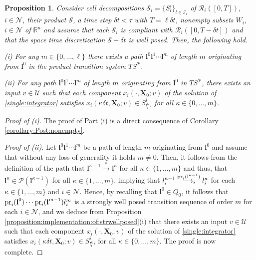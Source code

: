 \documentclass[reqno]{amsart}
\theoremstyle{plain}
\newtheorem{prop}[thm]{Proposition}
\theoremstyle{definition}
\numberwithin{equation}{section}
\begin{document}
\begin{prop} \label{proposition:sampled:traj:consistency}
Consider cell decompositions ${\ensuremath{\mathcal{S}}}_i=\{S_l^i\}_{l\in{\ensuremath{\mathcal{I}}}_i}$ of ${\ensuremath{\mathcal{R}}}_i([0,T])$, $i\in{\ensuremath{\mathcal{N}}}$, their product ${\ensuremath{\mathcal{S}}}$, a time step $\delta t<\tau$ with $T=\ell\delta t$, nonempty subsets $W_i$, $i\in{\ensuremath{\mathcal{N}}}$ of ${\ensuremath{\mathbb{R}^{{n}}}}$ and assume that each ${\ensuremath{\mathcal{S}}}_i$ is compliant with  ${\ensuremath{\mathcal{R}}}_i([0,T-\delta t])$ and that the space time discretization ${\ensuremath{\mathcal{S}}}-\delta t$ is well posed. Then, the following hold.

\noindent \textit{(i)} For any $m\in\{0,\ldots,\ell\}$ there exists a path ${\textbf{{l}}}^0 {\textbf{{l}}}^1\cdots{\textbf{{l}}}^{m}$ of length $m$ originating from ${\textbf{{l}}}^0$ in the product transition system $TS^{\ensuremath{\mathcal{P}}}$.

\noindent \textit{(ii)} For any path ${\textbf{{l}}}^0 {\textbf{{l}}}^1\cdots{\textbf{{l}}}^{m}$ of length $m$ originating from ${\textbf{{l}}}^0$ in $TS^{\ensuremath{\mathcal{P}}}$, there exists an input $v\in\mathcal{U}$ such that each component $x_i(\cdot,{\textbf{{X}}}_0;v)$ of the solution of \eqref{single:integrator} satisfies $x_i(\kappa\delta t,{\textbf{{X}}}_0;v)\in S^i_{l_i^{\kappa}}$, for all $\kappa\in\{0,\ldots,m\}$.
\end{prop}

\begin{proof}[Proof of (i)]
The proof of Part (i) is a direct consequence of Corollary \ref{corollary:Post:nonempty}.

\noindent \textit{Proof of (ii).} Let ${\textbf{{l}}}^0 {\textbf{{l}}}^1\cdots{\textbf{{l}}}^{m}$  be a path of length $m$ originating from ${\textbf{{l}}}^0$ and assume that without any loss of generality it holds $m\ne 0$. Then, it follows from the definition of the path that ${\textbf{{l}}}^{\kappa-1}\overset{*}{\longrightarrow}{\textbf{{l}}}^{\kappa}$ for all $\kappa\in\{1,\ldots,m\}$ and thus, that ${\textbf{{l}}}^{\kappa}\in{\ensuremath{\mathcal{P}}}({\textbf{{l}}}^{\kappa-1})$ for all $\kappa\in\{1,\ldots,m\}$, implying that $l_i^{\kappa-1}\overset{{\rm pr}_i({\textbf{{l}}}^{\kappa-1})}{\longrightarrow_i}l_i^{\kappa}$ for each $\kappa\in\{1,\ldots,m\}$ and $i\in{\ensuremath{\mathcal{N}}}$. Hence, by recalling that ${\textbf{{l}}}^0\in Q_0$, it follows that ${\rm pr}_i({\textbf{{l}}}^0)\cdots{\rm pr}_i({\textbf{{l}}}^{m-1})l^m_i$ is a strongly well posed transition sequence of order $m$ for each $i\in{\ensuremath{\mathcal{N}}}$, and we  
deduce from Proposition \ref{proposition:implementation:of:strwellposed}(i) that there exists an input $v\in\mathcal{U}$ such that each component $x_i(\cdot,{\textbf{{X}}}_0;v)$ of the solution of \eqref{single:integrator} satisfies $x_i(\kappa\delta t,{\textbf{{X}}}_0;v)\in S^i_{l_i^{\kappa}}$, for all $\kappa\in\{0,\ldots,m\}$. The proof is now complete. 
\end{proof}
\end{document}
